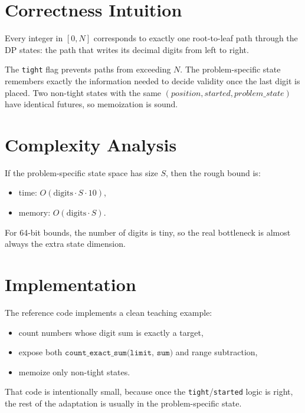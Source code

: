 \section*{Correctness Intuition}

Every integer in \([0, N]\) corresponds to exactly one root-to-leaf path through the DP states: the path that writes
its decimal digits from left to right.

The \texttt{tight} flag prevents paths from exceeding \(N\). The problem-specific state remembers exactly the
information needed to decide validity once the last digit is placed. Two non-tight states with the same
\((position, started, problem\_state)\) have identical futures, so memoization is sound.

\section*{Complexity Analysis}

If the problem-specific state space has size \(S\), then the rough bound is:

\begin{itemize}
  \item time: \(O(\text{digits} \cdot S \cdot 10)\),
  \item memory: \(O(\text{digits} \cdot S)\).
\end{itemize}

For 64-bit bounds, the number of digits is tiny, so the real bottleneck is almost always the extra state dimension.

\section*{Implementation}

The reference code implements a clean teaching example:

\begin{itemize}
  \item count numbers whose digit sum is exactly a target,
  \item expose both \(\texttt{count\_exact\_sum(limit, sum)}\) and range subtraction,
  \item memoize only non-tight states.
\end{itemize}

That code is intentionally small, because once the \texttt{tight}/\texttt{started} logic is right, the rest of the
adaptation is usually in the problem-specific state.

